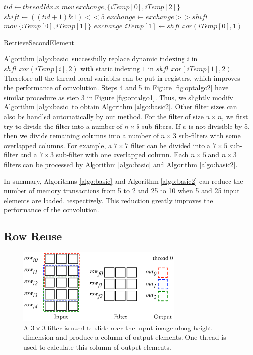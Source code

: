 \begin{algorithm}[t!]
	$tid \gets threadIdx.x$\;
	$mov\ exchange, \{iTemp[0], iTemp[2]\}$\;
	$shift \gets ((tid+1)\&1)<<5$\;
	$exchange \gets exchange >> shift$\;
	$mov\ \{iTemp[0],iTemp[1]\}, exchange$\;
	$iTemp[1] \gets shfl\_xor(iTemp[0],1)$\;	
	\caption{RetrieveSecondElement}
	\label{algo:basic2}
\end{algorithm}

Algorithm \ref{algo:basic} successfully replace dynamic indexing $i$ in $shfl\_xor(iTemp[i],2)$ with static indexing $1$ in $shfl\_xor(iTemp[1],2)$. {\color{red}Therefore all the thread local variables can be put in registers,} which improves the performance of convolution. Steps 4 and 5 in Figure \ref{fig:optalgo2} have similar procedure as step 3 in Figure \ref{fig:optalgo1}. Thus, we slightly modify Algorithm \ref{algo:basic} to obtain Algorithm \ref{algo:basic2}. {\color{red}Other filter sizes can also be handled automatically by our method. For the filter of size $n \times n$, we first try to divide the filter into a number of $n \times 5$ sub-filters. If $n$ is not divisible by 5, then we divide remaining columns into a number of $n \times 3$ sub-filters with some overlapped columns. For example, a $7 \times 7$ filter can be divided into a $7 \times 5$ sub-filter and a $7 \times 3$ sub-filter with one overlapped column. Each $n \times 5$ and $n \times 3$ filters can be processed by Algorithm \ref{algo:basic} and Algorithm \ref{algo:basic2}.} 


In summary, Algorithms \ref{algo:basic} and Algorithm \ref{algo:basic2} can reduce the number of memory transactions from 5 to 2 and 25 to 10 when 5 and 25 input elements are loaded, respectively. This reduction greatly improves the performance of the convolution.

\subsection{Row Reuse}
\label{sec:rowreuse}
\begin{figure}
	\centering
	\includegraphics[width=0.9\columnwidth,height=3.7cm]{./figure/rowreuse.eps}
\caption{A $3 \times 3$ filter is used to slide over the input image along height dimension and produce a column of output elements. One thread is used to calculate this column of output elements.}
\label{fig:rowreuse}
\end{figure}


